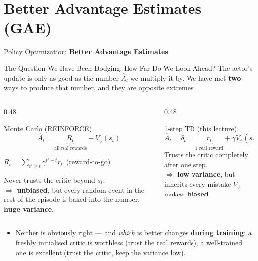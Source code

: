 \section{Better Advantage Estimates (GAE)}
\begin{frame}{}
    \LARGE Policy Optimization: \textbf{Better Advantage Estimates}
\end{frame}

\begin{frame}{The Question We Have Been Dodging: How Far Do We Look Ahead?}
The actor's update is only as good as the number $\hat{A}_t$ we multiply it by. We have met \textbf{two} ways to produce that number, and they are opposite extremes:
\vspace{0.4em}
\begin{columns}
\begin{column}{0.48\textwidth}
\begin{block}{Monte Carlo (REINFORCE)}
$$\hat{A}_t = \underbrace{R_t}_{\text{all real rewards}} - V_\phi(s_t)$$
\vspace{-0.9em}
\begin{center}\footnotesize $R_t = \sum_{t' \geq t} \gamma^{t'-t} r_{t'}$ (reward-to-go)\end{center}
Never trusts the critic beyond $s_t$.\\
$\Rightarrow$ \textbf{unbiased}, but every random event in the rest of the episode is baked into the number: \textbf{huge variance}.
\end{block}
\end{column}
\begin{column}{0.48\textwidth}
\begin{block}{1-step TD (this lecture)}
$$\hat{A}_t = \delta_t = \underbrace{r_t}_{\text{1 real reward}} + \gamma V_\phi(s_{t+1}) - V_\phi(s_t)$$
Trusts the critic completely after one step.\\
$\Rightarrow$ \textbf{low variance}, but inherits every mistake $V_\phi$ makes: \textbf{biased}.
\end{block}
\end{column}
\end{columns}
\vspace{0.6em}
\begin{itemize}
    \item Neither is obviously right --- and \emph{which} is better changes \textbf{during training}: a freshly initialised critic is worthless (trust the real rewards), a well-trained one is excellent (trust the critic, keep the variance low).
\end{itemize}
\end{frame}

